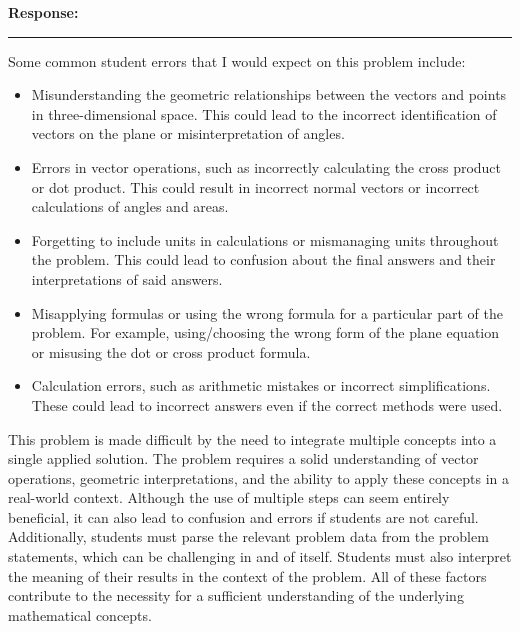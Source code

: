 \documentclass[12pt]{article} %
\numberwithin{equation}{section}
\begin{document}
\begin{enumerate}[label=\roman*.]
            \bigskip
            \hspace{0.5em}
            \textbf{Response:}
            \begin{center}
            \rule{\linewidth}{1pt}
            \end{center}
            \indent Some common student errors that I would expect on this problem include:
            \begin{itemize}
                \item Misunderstanding the geometric relationships between the vectors and points in three-dimensional space.
                    This could lead to the incorrect identification of vectors on the plane or misinterpretation of angles.
                \item Errors in vector operations, such as incorrectly calculating the cross product or dot product.
                    This could result in incorrect normal vectors or incorrect calculations of angles and areas.
                \item Forgetting to include units in calculations or mismanaging units throughout the problem.
                    This could lead to confusion about the final answers and their interpretations of said answers.
                \item Misapplying formulas or using the wrong formula for a particular part of the problem.
                    For example, using/choosing the wrong form of the plane equation or misusing the dot or cross product formula.
                \item Calculation errors, such as arithmetic mistakes or incorrect simplifications.
                    These could lead to incorrect answers even if the correct methods were used.
            \end{itemize}
\pagebreak[3]
            \indent This problem is made difficult by the need to integrate multiple concepts into a single applied solution.
            The problem requires a solid understanding of vector operations, geometric interpretations, and the ability to apply these concepts in a real-world context.
            Although the use of multiple steps can seem entirely beneficial, it can also lead to confusion and errors if students are not careful.
            Additionally, students must parse the relevant problem data from the problem statements, which can be challenging in and of itself.
            Students must also interpret the meaning of their results in the context of the problem.
            All of these factors contribute to the necessity for a sufficient understanding of the underlying mathematical concepts.

\end{enumerate}
\end{document}
